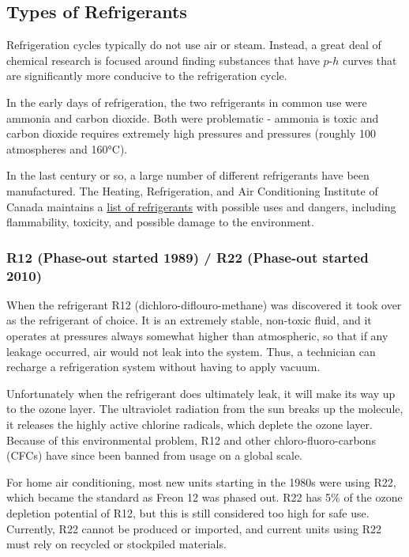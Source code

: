 \subsection{Types of Refrigerants}
Refrigeration cycles typically do not use air or steam.  Instead, a great deal of chemical research is focused around finding substances that have $p$-$h$ curves that are significantly more conducive to the refrigeration cycle.

In the early days of refrigeration, the two refrigerants in common use were ammonia and carbon dioxide. Both were problematic - ammonia is toxic and carbon dioxide requires extremely high pressures and pressures (roughly 100 atmospheres and 160°C).

In the last century or so, a large number of different refrigerants have been manufactured.  The Heating, Refrigeration, and Air Conditioning Institute of Canada maintains a \href{https://www.hrai.ca/uploads/userfiles/files/refrigerant_table_June2019.pdf}{list of refrigerants} with possible uses and dangers, including flammability, toxicity, and possible damage to the environment.

\subsubsection{R12 (Phase-out started 1989) / R22 (Phase-out started 2010)}
When the refrigerant R12 (dichloro-diflouro-methane) was discovered it took over as the refrigerant of choice. It is an extremely stable, non-toxic fluid, and it operates at pressures always somewhat higher than atmospheric, so that if any leakage occurred, air would not leak into the system.  Thus, a technician can recharge a refrigeration system without having to apply vacuum.

Unfortunately when the refrigerant does ultimately leak, it will make its way up to the ozone layer. The ultraviolet radiation from the sun breaks up the molecule, it releases the highly active chlorine radicals, which deplete the ozone layer. Because of this environmental problem, R12 and other chloro-fluoro-carbons (CFCs) have since been banned from usage on a global scale.

For home air conditioning, most new units starting in the 1980s were using R22, which became the standard as Freon 12 was phased out.  R22 has 5\% of the ozone depletion potential of R12, but this is still considered too high for safe use.  Currently, R22 cannot be produced or imported, and current units using R22 must rely on recycled or stockpiled materials.

